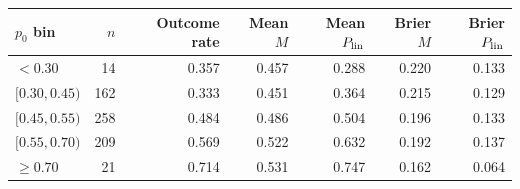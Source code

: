 \begin{tabular}{lrrrrrr}
\toprule
$p_0$ bin & $n$ & Outcome rate & Mean $M$ & Mean $P_{\rm lin}$ & Brier $M$ & Brier $P_{\rm lin}$ \\
\midrule
$<0.30$ & 14 & 0.357 & 0.457 & 0.288 & 0.220 & 0.133 \\
$[0.30,0.45)$ & 162 & 0.333 & 0.451 & 0.364 & 0.215 & 0.129 \\
$[0.45,0.55)$ & 258 & 0.484 & 0.486 & 0.504 & 0.196 & 0.133 \\
$[0.55,0.70)$ & 209 & 0.569 & 0.522 & 0.632 & 0.192 & 0.137 \\
$\geq0.70$ & 21 & 0.714 & 0.531 & 0.747 & 0.162 & 0.064 \\
\bottomrule
\end{tabular}
